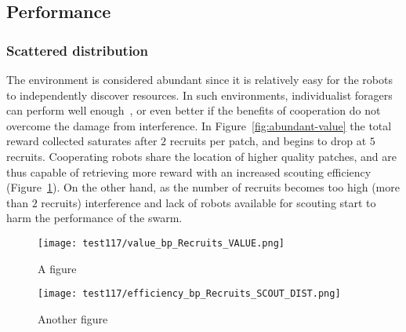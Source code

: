 \documentclass[runningheads]{llncs}
\begin{document}
\subsection{Performance}
\label{subsec:performance}

\subsubsection{Scattered distribution}

The environment is considered abundant since it is relatively easy for the robots to independently discover resources. In such environments, individualist foragers can perform well enough~\cite{pitonakova_icr_2018,wilson_sociobiology_2000}, or even better if the benefits of cooperation do not overcome the damage from interference. In Figure~\ref{fig:abundant-value} the total reward collected saturates after $2$ recruits per patch, and begins to drop at $5$ recruits. Cooperating robots share the location of higher quality patches, and are thus capable of retrieving more reward with an increased scouting efficiency (Figure~\ref{fig:abundant-eff-exp}). On the other hand, as the number of recruits becomes too high (more than $2$ recruits) interference and lack of robots available for scouting start to harm the performance of the swarm.

\begin{figure}
\centering
\begin{minipage}{.495\textwidth}
  \centering
  \texttt{[image: test117/value\_bp\_Recruits\_VALUE.png]}
  \caption{A figure}
  \label{fig:abundant-value}
\end{minipage}
\centering
\begin{minipage}{.495\textwidth}
  \centering
  \texttt{[image: test117/efficiency\_bp\_Recruits\_SCOUT\_DIST.png]}
  \caption{Another figure}
  \label{fig:abundant-eff-exp}
\end{minipage}
\end{figure}

\end{document}
